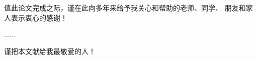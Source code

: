 \begin{table}[c]
\centering 
\parbox{0.5\textwidth}{
\begin{center}

值此论文完成之际，谨在此向多年来给予我关心和帮助的老师、同学、
朋友和家人表示衷心的感谢！

......

\vskip 18pt
谨把本文献给我最敬爱的人！
\end{center}
}
\end{table}
